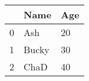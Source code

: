 \begin{tabular}{lll}
\toprule
 & Name & Age \\
\midrule
0 & Ash & 20 \\
1 & Bucky & 30 \\
2 & ChaD & 40 \\
\bottomrule
\end{tabular}
